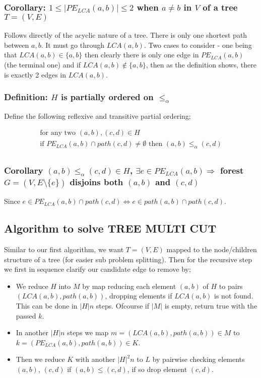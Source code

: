 \documentclass{article}
\begin{document}
\subsubsection*{Corollary: $1 \leq |PE_{LCA}(a,b)| \leq 2$ when $a \neq b$ in $V$ of a tree $T = (V,E)$}
Follows directly of the acyclic nature of a tree. There is only one shortest path between $a,b$. It must go through $LCA(a,b)$. Two cases to consider - one being that $LCA(a,b) \in \{a, b\}$ then clearly there is only one edge in $PE_{LCA}(a,b)$ (the terminal one) and if $LCA(a,b) \not\in \{a, b\}$, then as the definition shows, there is exactly 2 edges in $LCA(a,b)$.

\subsubsection*{Definition: $H$ is partially ordered on $\leq_{\alpha}$}
Define the following reflexive and transitive partial ordering;

\begin{align*}
 \text{for any two } (a, b), (c, d) \in H \\
 \text{if } PE_{LCA}(a,b) \cap path(c,d) \neq \emptyset \text{ then } (a,b) \leq_{\alpha} (c,d) \\
\end{align*}

\subsubsection*{Corollary $(a,b) \leq_{\alpha} (c,d) \in H$, $\exists e \in PE_{LCA}(a,b) \Rightarrow$ forest $G = (V, E\setminus \{e\})$ disjoins both $(a,b)$ and $(c,d)$}
Since $e \in PE_{LCA}(a,b) \cap path(c,d) \Leftrightarrow e \in path(a,b) \cap path(c,d)$.

\subsection*{Algorithm to solve TREE MULTI CUT}
Similar to our first algorithm, we want $T = (V,E)$ mapped to the node/children structure of a tree (for easier sub problem splitting). Then for the recursive step we first in sequence clarify our candidate edge to remove by;

\begin{itemize}
  \item We reduce $H$ into $M$ by map reducing each element $(a,b)$ of $H$ to pairs $(LCA(a,b), path(a,b))$, dropping elements if $LCA(a,b)$ is not found. This can be done in $|H|n$ steps. Ofcourse if $|M|$ is empty, return true with the passed $k$. 
  \item In another $|H|n$ steps we map $m = (LCA(a,b), path(a,b)) \in M$ to $k = (PE_{LCA}(a,b), path(a,b))\in K$.
  \item Then we reduce $K$ with another $|H|^2n$ to $L$ by pairwise checking elements $(a,b)$, $(c,d)$ if $(a,b) \leq (c,d)$, if so drop element $(c,d)$.
\end{itemize}
\end{document}
